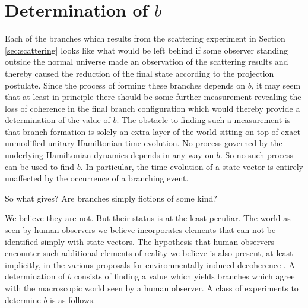 \documentclass[12pt,amsmath,amssymb,onecolumn]{revtex4-2}
\begin{document}
  





\section{\label{sec:bmeasurement} Determination of $b$}



Each of the branches which results from the scattering experiment
in Section \ref{sec:scattering} looks like 
what would be left behind if 
some observer standing outside the
normal universe made an observation of the scattering
results and thereby caused the reduction of
the final state according to the projection postulate.
Since the process of
forming these branches depends on $b$, it may seem that at
least in principle there should be some further measurement
revealing the loss of coherence in the final branch configuration
which would thereby provide a determination of the value of $b$.
The obstacle to finding such a measurement
is that branch formation is solely an extra layer of
the world sitting on top of exact unmodified
unitary Hamiltonian time evolution.
No process governed by the underlying Hamiltonian
dynamics depends in any way on $b$.
So no such process can be used to find $b$.
In particular, the time evolution of a state
vector is entirely unaffected by the occurrence of
a branching event.

So what gives? Are branches simply fictions of some kind?

We believe they are not.  But their status is at the least peculiar.
The world as seen by human observers we believe incorporates elements that
can not be identified simply with state vectors.
The hypothesis that human observers encounter
such additional elements of reality we believe
is also present, at least implicitly, in
the various proposals
for environmentally-induced decoherence \cite{Zeh, Zurek, Zurek1, Zurek2, Wallace, Riedel}.
A determination of $b$ consists of finding a value
which yields branches which agree with
the macroscopic world seen by a human observer.
A class
of experiments
to determine $b$ is as follows.
\end{document}
